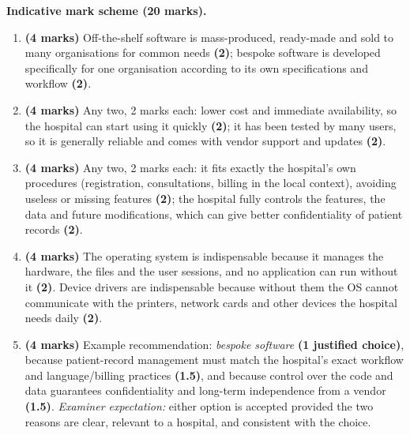 \documentclass[11pt]{article}
\begin{document}
\begin{corrige}
\textbf{Indicative mark scheme (20 marks).}
\begin{enumerate}
\item \textbf{(4 marks)} Off-the-shelf software is mass-produced, ready-made and sold to many organisations for common needs \textbf{(2)}; bespoke software is developed specifically for one organisation according to its own specifications and workflow \textbf{(2)}.
\item \textbf{(4 marks)} Any two, 2 marks each: lower cost and immediate availability, so the hospital can start using it quickly \textbf{(2)}; it has been tested by many users, so it is generally reliable and comes with vendor support and updates \textbf{(2)}.
\item \textbf{(4 marks)} Any two, 2 marks each: it fits exactly the hospital's own procedures (registration, consultations, billing in the local context), avoiding useless or missing features \textbf{(2)}; the hospital fully controls the features, the data and future modifications, which can give better confidentiality of patient records \textbf{(2)}.
\item \textbf{(4 marks)} The operating system is indispensable because it manages the hardware, the files and the user sessions, and no application can run without it \textbf{(2)}. Device drivers are indispensable because without them the OS cannot communicate with the printers, network cards and other devices the hospital needs daily \textbf{(2)}.
\item \textbf{(4 marks)} Example recommendation: \emph{bespoke software} \textbf{(1 justified choice)}, because patient-record management must match the hospital's exact workflow and language/billing practices \textbf{(1.5)}, and because control over the code and data guarantees confidentiality and long-term independence from a vendor \textbf{(1.5)}. \emph{Examiner expectation:} either option is accepted provided the two reasons are clear, relevant to a hospital, and consistent with the choice.
\end{enumerate}
\end{corrige}
\end{document}
